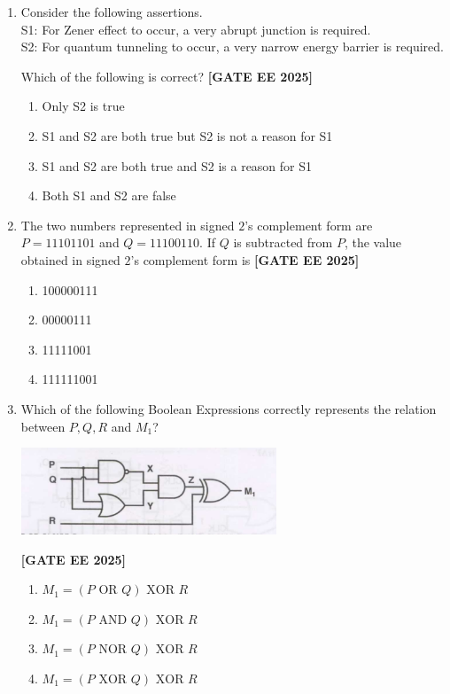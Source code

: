 \documentclass[12pt,a4paper]{article}
\begin{document}
\begin{enumerate}[leftmargin=*, label=\textbf{Q.\arabic*:}]
\item Consider the following assertions. \\
S1: For Zener effect to occur, a very abrupt junction is required. \\
S2: For quantum tunneling to occur, a very narrow energy barrier is required.

Which of the following is correct?
\newline
\noindent \textbf{[GATE EE 2025]}
\begin{enumerate}[label=(\Alph*)]
    \item Only S2 is true
    \item S1 and S2 are both true but S2 is not a reason for S1
    \item S1 and S2 are both true and S2 is a reason for S1
    \item Both S1 and S2 are false
\end{enumerate}

\item The two numbers represented in signed $2$'s complement form are \\
$P=11101101$ and $Q=11100110$. If $Q$ is subtracted from $P$, the value obtained in signed $2$'s complement form is
\newline
\noindent \textbf{[GATE EE 2025]}
\begin{enumerate}[label=(\Alph*)]
    \item 100000111
    \item 00000111
    \item 11111001
    \item 111111001
\end{enumerate}

\item Which of the following Boolean Expressions correctly represents the relation between $P, Q, R$ and $M_1$?
\begin{center}
\includegraphics[width=0.6\textwidth]{figs/q57.png}
\end{center}
\newline
\noindent \textbf{[GATE EE 2025]}
\begin{enumerate}[label=(\Alph*)]
  \item $M_1 = (P \text{ OR } Q) \text{ XOR } R$
  \item $M_1 = (P \text{ AND } Q) \text{ XOR } R$
  \item $M_1 = (P \text{ NOR } Q) \text{ XOR } R$
  \item $M_1 = (P \text{ XOR } Q) \text{ XOR } R$
\end{enumerate}


\end{enumerate}
\end{document}
